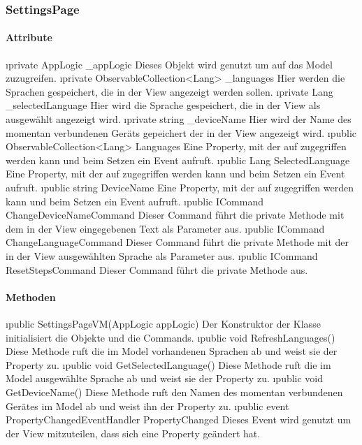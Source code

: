 \documentclass[../entwurf.tex]{subfiles}
\begin{document}
\subsubsection{SettingsPage}
\paragraph{Attribute}
\begin{itemize}
	\i{private AppLogic \_appLogic} Dieses Objekt wird genutzt um auf das Model zuzugreifen.
	\i{private ObservableCollection<Lang> \_languages} Hier werden die Sprachen gespeichert, die in der View angezeigt werden sollen.
	\i{private Lang \_selectedLanguage} Hier wird die Sprache gespeichert, die in der View als ausgewählt angezeigt wird.
	\i{private string \_deviceName} Hier wird der Name des momentan verbundenen Geräts gepeichert der in der View angezeigt wird.
	\i{public ObservableCollection<Lang> Languages} Eine Property, mit der auf  zugegriffen werden kann und beim Setzen ein Event aufruft.
	\i{public Lang SelectedLanguage} Eine Property, mit der auf  zugegriffen werden kann und beim Setzen ein Event aufruft.
	\i{public string DeviceName} Eine Property, mit der auf  zugegriffen werden kann und beim Setzen ein Event aufruft.
	\i{public ICommand ChangeDeviceNameCommand} Dieser Command führt die private Methode  mit dem in der View eingegebenen Text als Parameter aus.
	\i{public ICommand ChangeLanguageCommand} Dieser Command führt die private Methode  mit der in der View ausgewählten Sprache als Parameter aus.
	\i{public ICommand ResetStepsCommand} Dieser Command führt die private Methode  aus.
\end{itemize}
\paragraph{Methoden}
\begin{itemize}
	\i{public SettingsPageVM(AppLogic appLogic)} Der Konstruktor der Klasse initialisiert die Objekte  und die Commands.
	\i{public void RefreshLanguages()} Diese Methode ruft die im Model vorhandenen Sprachen ab und weist sie der Property  zu.
	\i{public void GetSelectedLanguage()} Diese Methode ruft die im Model ausgewählte Sprache ab und weist sie der Property  zu.
	\i{public void GetDeviceName()} Diese Methode ruft den Namen des momentan verbundenen Gerätes im Model ab und weist ihn der Property  zu.
	\i{public event PropertyChangedEventHandler PropertyChanged} Dieses Event wird genutzt um der View mitzuteilen, dass sich eine Property geändert hat.
\end{itemize}
\end{document}
